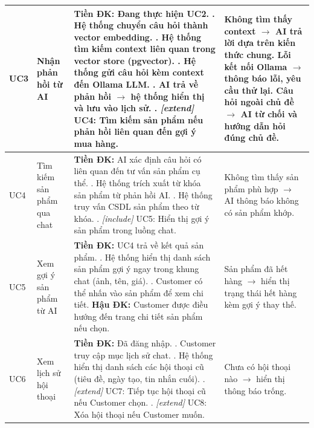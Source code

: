 \begin{longtable}{|>{\raggedright\arraybackslash}p{2cm}|>{\raggedright\arraybackslash}p{2.5cm}|>{\raggedright\arraybackslash}p{4cm}|>{\raggedright\arraybackslash}p{5.5cm}|}
UC3 & Nhận phản hồi từ AI &
  \textbf{Tiền ĐK:} Đang thực hiện UC2. \newline
  1. Hệ thống chuyển câu hỏi thành vector embedding. \newline
  2. Hệ thống tìm kiếm context liên quan trong vector store (pgvector). \newline
  3. Hệ thống gửi câu hỏi kèm context đến Ollama LLM. \newline
  4. AI trả về phản hồi $\to$ hệ thống hiển thị và lưu vào lịch sử. \newline
  5. \textit{[extend]} UC4: Tìm kiếm sản phẩm nếu phản hồi liên quan đến gợi ý mua hàng. &
  Không tìm thấy context $\to$ AI trả lời dựa trên kiến thức chung. \newline
  Lỗi kết nối Ollama $\to$ thông báo lỗi, yêu cầu thử lại. \newline
  Câu hỏi ngoài chủ đề $\to$ AI từ chối và hướng dẫn hỏi đúng chủ đề. \\
\hline

UC4 & Tìm kiếm sản phẩm qua chat &
  \textbf{Tiền ĐK:} AI xác định câu hỏi có liên quan đến tư vấn sản phẩm cụ thể. \newline
  1. Hệ thống trích xuất từ khóa sản phẩm từ phản hồi AI. \newline
  2. Hệ thống truy vấn CSDL sản phẩm theo từ khóa. \newline
  3. \textit{[include]} UC5: Hiển thị gợi ý sản phẩm trong luồng chat. &
  Không tìm thấy sản phẩm phù hợp $\to$ AI thông báo không có sản phẩm khớp. \\
\hline

UC5 & Xem gợi ý sản phẩm từ AI &
  \textbf{Tiền ĐK:} UC4 trả về kết quả sản phẩm. \newline
  1. Hệ thống hiển thị danh sách sản phẩm gợi ý ngay trong khung chat (ảnh, tên, giá). \newline
  2. Customer có thể nhấn vào sản phẩm để xem chi tiết. \newline
  \textbf{Hậu ĐK:} Customer được điều hướng đến trang chi tiết sản phẩm nếu chọn. &
  Sản phẩm đã hết hàng $\to$ hiển thị trạng thái hết hàng kèm gợi ý thay thế. \\
\hline

UC6 & Xem lịch sử hội thoại &
  \textbf{Tiền ĐK:} Đã đăng nhập. \newline
  1. Customer truy cập mục lịch sử chat. \newline
  2. Hệ thống hiển thị danh sách các hội thoại cũ (tiêu đề, ngày tạo, tin nhắn cuối). \newline
  3. \textit{[extend]} UC7: Tiếp tục hội thoại cũ nếu Customer chọn. \newline
  4. \textit{[extend]} UC8: Xóa hội thoại nếu Customer muốn. &
  Chưa có hội thoại nào $\to$ hiển thị thông báo trống. \\
\hline


\end{longtable}
